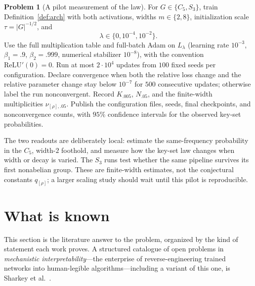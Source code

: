 \documentclass[11pt]{amsart}
\theoremstyle{plain}
\theoremstyle{definition}
\newtheorem{problem}[theorem]{Problem}
\begin{document}
\begin{problem}[A pilot measurement of the law]\label{start:measure}
For $G\in\{C_5,S_3\}$, train Definition~\ref{def:arch} with both activations, widths $m\in\{2,8\}$, initialization scale $\tau=|G|^{-1/2}$, and
\[
\lambda\in\{0,10^{-4},10^{-2}\}.
\]
Use the full multiplication table and full-batch Adam on $L_\lambda$ (learning rate $10^{-3}$, $\beta_1=.9$, $\beta_2=.999$, numerical stabilizer $10^{-8}$), with the convention $\mathrm{ReLU}'(0)=0$. Run at most $2\cdot10^4$ updates from $100$ fixed seeds per configuration. Declare convergence when both the relative loss change and the relative parameter change stay below $10^{-7}$ for $500$ consecutive updates; otherwise label the run nonconvergent. Record $K_{.005}$, $N_{.05}$, and the finite-width multiplicities $\nu_{[\rho],.05}$. Publish the configuration files, seeds, final checkpoints, and nonconvergence counts, with $95\%$ confidence intervals for the observed key-set probabilities.

The two readouts are deliberately local: estimate the same-frequency probability in the $C_5$, width-$2$ foothold, and measure how the key-set law changes when width or decay is varied. The $S_3$ runs test whether the same pipeline survives its first nonabelian group. These are finite-width estimates, not the conjectural constants $q_{[\rho]}$; a larger scaling study should wait until this pilot is reproducible.
\end{problem}

\section{What is known}\label{sec:known}

This section is the literature answer to the problem, organized by the kind of statement each work proves. A structured catalogue of open problems in \emph{mechanistic interpretability}---the enterprise of reverse-engineering trained networks into human-legible algorithms---including a variant of this one, is Sharkey et al.~\cite{sharkey2025}.
\end{document}
